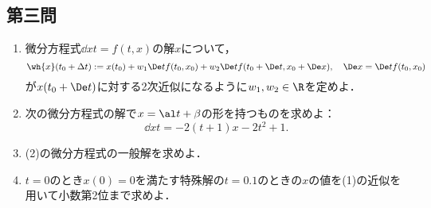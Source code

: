 \documentclass[uplatex,dvipdfmx]{jsarticle}
\begin{document}
\subsection{第三問}

\begin{tcolorbox}[colframe=ForestGreen, colback=ForestGreen!10!white,breakable,colbacktitle=ForestGreen!40!white,coltitle=black,fonttitle=\bfseries\sffamily,
    title=第３問]
    \begin{problem}\mbox{}\label{prob-2019-8-3}
        \begin{enumerate}
            \item 微分方程式$\dd{x}{t}=f(t,x)$の解$x$について，
            \[\wh{x}(t_0+\Delta t):=x(t_0)+w_1\De tf(t_0,x_0)+w_2\De tf(t_0+\De t,x_0+\De x),\quad\De x=\De tf(t_0,x_0)\]
            が$x(t_0+\De t)$に対する2次近似になるように$w_1,w_2\in\R$を定めよ．
            \item 次の微分方程式の解で$x=\al t+\beta$の形を持つものを求めよ：
            \[\dd{x}{t}=-2(t+1)x-2t^2+1.\]
            \item (2)の微分方程式の一般解を求めよ．
            \item $t=0$のとき$x(0)=0$を満たす特殊解の$t=0.1$のときの$x$の値を(1)の近似を用いて小数第2位まで求めよ．
        \end{enumerate}
    \end{problem}
\end{tcolorbox}
\end{document}
